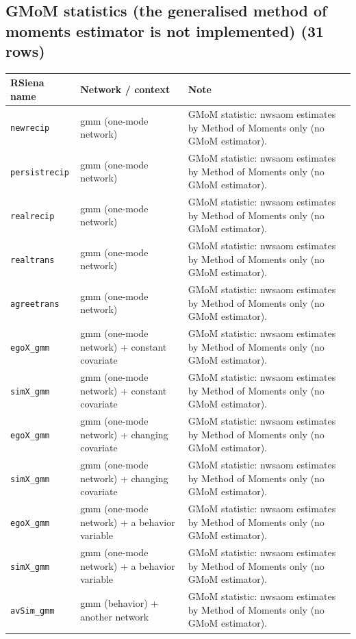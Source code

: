 \subsection*{GMoM statistics (the generalised method of moments estimator is not implemented) (31 rows)}
\footnotesize
\begin{longtable}{@{}p{2.8cm}p{4.6cm}p{6.5cm}@{}}
\toprule
RSiena name & Network / context & Note\\
\midrule
\endhead
\texttt{newrecip} & gmm (one-mode network) & GMoM statistic: nwsaom estimates by Method of Moments only (no GMoM estimator).\\
\texttt{persistrecip} & gmm (one-mode network) & GMoM statistic: nwsaom estimates by Method of Moments only (no GMoM estimator).\\
\texttt{realrecip} & gmm (one-mode network) & GMoM statistic: nwsaom estimates by Method of Moments only (no GMoM estimator).\\
\texttt{realtrans} & gmm (one-mode network) & GMoM statistic: nwsaom estimates by Method of Moments only (no GMoM estimator).\\
\texttt{agreetrans} & gmm (one-mode network) & GMoM statistic: nwsaom estimates by Method of Moments only (no GMoM estimator).\\
\texttt{egoX\_gmm} & gmm (one-mode network) + constant covariate & GMoM statistic: nwsaom estimates by Method of Moments only (no GMoM estimator).\\
\texttt{simX\_gmm} & gmm (one-mode network) + constant covariate & GMoM statistic: nwsaom estimates by Method of Moments only (no GMoM estimator).\\
\texttt{egoX\_gmm} & gmm (one-mode network) + changing covariate & GMoM statistic: nwsaom estimates by Method of Moments only (no GMoM estimator).\\
\texttt{simX\_gmm} & gmm (one-mode network) + changing covariate & GMoM statistic: nwsaom estimates by Method of Moments only (no GMoM estimator).\\
\texttt{egoX\_gmm} & gmm (one-mode network) + a behavior variable & GMoM statistic: nwsaom estimates by Method of Moments only (no GMoM estimator).\\
\texttt{simX\_gmm} & gmm (one-mode network) + a behavior variable & GMoM statistic: nwsaom estimates by Method of Moments only (no GMoM estimator).\\
\texttt{avSim\_gmm} & gmm (behavior) + another network & GMoM statistic: nwsaom estimates by Method of Moments only (no GMoM estimator).\\

\end{longtable}
